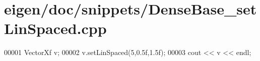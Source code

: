 \hypertarget{eigen_2doc_2snippets_2_dense_base__set_lin_spaced_8cpp_source}{}\section{eigen/doc/snippets/\+Dense\+Base\+\_\+set\+Lin\+Spaced.cpp}
\label{eigen_2doc_2snippets_2_dense_base__set_lin_spaced_8cpp_source}

\begin{DoxyCode}
00001 VectorXf v;
00002 v.setLinSpaced(5,0.5f,1.5f);
00003 cout << v << endl;
\end{DoxyCode}
